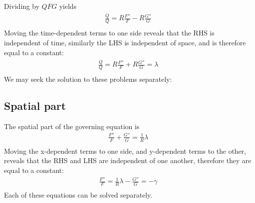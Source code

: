 \documentclass[11pt]{article}
\begin{document}
Dividing by $QFG$ yields
\begin{equation}\begin{aligned}
\frac{\dot{Q}}{Q} = R \frac{F''}{F} - R \frac{G''}{G} \\
\end{aligned} \end{equation}
Moving the time-dependent terms to one side reveals that the RHS is independent of time, similarly the LHS is independent of space, and is therefore equal to a constant:
\begin{equation}\begin{aligned}
\frac{\dot{Q}}{Q} = R \frac{F''}{F} + R \frac{G''}{G} = \lambda \\
\end{aligned} \end{equation}
We may seek the solution to these problems separately:

\subsection{Spatial part}
The spatial part of the governing equation is
\begin{equation}\begin{aligned}
 \frac{F''}{F} + \frac{G''}{G} = \frac{1}{R} \lambda \\
\end{aligned} \end{equation}
Moving the x-dependent terms to one side, and y-dependent terms to the other, reveals that the RHS and LHS are independent of one another, therefore they are equal to a constant:
\begin{equation}\begin{aligned}
 \frac{F''}{F} = \frac{1}{R} \lambda - \frac{G''}{G} = - \gamma \\
\end{aligned} \end{equation}
Each of these equations can be solved separately.
\end{document}

